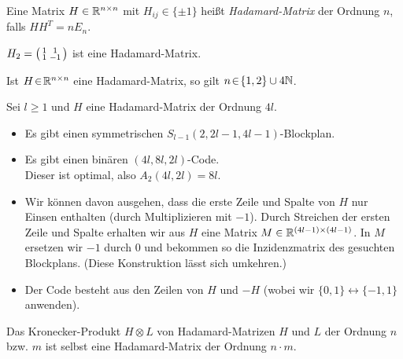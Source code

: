 \documentclass{cheat-sheet}
\begin{document}
\begin{defn}
  Eine Matrix $H \in \mathbb{R}^{n \times n}$ mit $H_{ij} \in \{ \pm 1 \}$ heißt \emph{Hadamard-Matrix} der Ordnung $n$, falls $H H^T = n E_n$.
\end{defn}

\begin{bsp}
  $H_2 = \begin{psmallmatrix}
    1 & 1 \\
    1 & -1
  \end{psmallmatrix}$
  ist eine Hadamard-Matrix.
\end{bsp}

\begin{satz}
  Ist $H \!\in\! \mathbb{R}^{n \times n}$ eine Hadamard-Matrix, so gilt $n \!\in\! \{ 1, 2 \} \cup 4 \mathbb{N}$.
\end{satz}

\begin{satz}
  Sei $l \geq 1$ und $H$ eine Hadamard-Matrix der Ordnung $4 l$.
  \begin{itemize}
    \item Es gibt einen symmetrischen $S_{l-1}(2, 2l - 1, 4l - 1)$-Blockplan.
    \item Es gibt einen binären $(4l, 8l, 2l)$-Code. \\
    Dieser ist optimal, also $A_2(4l, 2l) = 8l$.
  \end{itemize}
\end{satz}

\begin{konstr}
  \begin{itemize}
    \item Wir können davon ausgehen, dass die erste Zeile und Spalte von $H$ nur Einsen enthalten (durch Multiplizieren mit $-1$).
    Durch Streichen der ersten Zeile und Spalte erhalten wir aus $H$ eine Matrix $M \in \mathbb{R}^{(4l - 1) \times (4l - 1)}$.
    In $M$ ersetzen wir $-1$ durch $0$ und bekommen so die Inzidenzmatrix des gesuchten Blockplans.
    (Diese Konstruktion lässt sich umkehren.)
    \item Der Code besteht aus den Zeilen von $H$ und $-H$ (wobei wir $\{ 0, 1 \} \leftrightarrow \{ -1, 1 \}$ anwenden).
  \end{itemize}
\end{konstr}

\begin{lem}
  Das Kronecker-Produkt $H \otimes L$ von Hadamard-Matrizen $H$ und $L$ der Ordnung $n$ bzw. $m$ ist selbst eine Hadamard-Matrix der Ordnung $n \cdot m$.
\end{lem}
\end{document}
